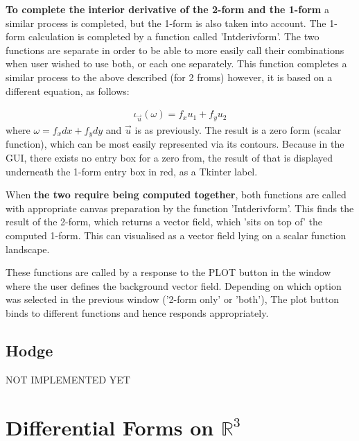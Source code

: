 \documentclass[12pt]{report}
\begin{document}
\noindent \textbf{To complete the interior derivative of the 2-form and the 1-form} a similar process is completed, but the 1-form is also taken into account. The 1-form calculation is completed by a function called 'Int\textunderscore deriv\textunderscore form'. The two functions are separate in order to be able to more easily call their combinations when user wished to use both, or each one separately. This function completes a similar process to the above described (for 2 froms) however, it is based on a different equation, as follows:

\begin{equation}
	\label{T2} \begin{split}
		\iota_{\vec{u}}(\omega) = f_{x} u_{1} + f_{y} u_{2}
	\end{split}
\end{equation}
where $\omega = f_{x} dx + f_{y} dy$ and $\vec{u}$ is as previously. The result is a zero form (scalar function), which can be most easily represented via its contours. Because in the GUI, there exists no entry box for a zero from, the result of that is displayed underneath the 1-form entry box in red, as a Tkinter label.

When \textbf{the two require being computed together}, both functions are called with appropriate canvas preparation by the function 'Int\textunderscore deriv\textunderscore form'. This finds the result of the 2-form, which returns a vector field, which 'sits on top of' the computed 1-form. This can visualised as a vector field lying on a scalar function landscape.

\noindent These functions are called by a response to the PLOT button in the window where the user defines the background vector field. Depending on which option was selected in the previous window ('2-form only' or 'both'), The plot button binds to different functions and hence responds appropriately.

\section{Hodge}


NOT IMPLEMENTED YET



\chapter{Differential Forms on $\mathbb{R}^{3}$}
\end{document}
